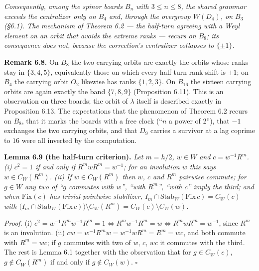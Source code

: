 \documentclass[
]{article}
\begin{document}
\emph{Consequently, among the spinor boards \(B_n\) with
\(3 \le n \le 8\), the shared grammar exceeds the centralizer only on
\(B_4\) and, through the overgroup \(W(D_4)\), on \(B_3\) (§6.1). The
mechanism of Theorem 6.2 --- the half-turn agreeing with a Weyl element
on an orbit that avoids the extreme ranks --- recurs on \(B_8\); its
consequence does not, because the correction's centralizer collapses to
\(\{\pm 1\}\).}

\textbf{Remark 6.8.} On \(B_8\) the two carrying orbits are exactly the
orbits whose ranks stay in \(\{3,4,5\}\), equivalently those on which
every half-turn rank-shift is \(\pm 1\); on \(B_4\) the carrying orbit
\(O_2\) likewise has ranks \(\{1,2,3\}\). On \(B_{16}\) the sixteen
carrying orbits are again exactly the band \(\{7,8,9\}\) (Proposition
6.11). This is an observation on three boards; the orbit of \(\lambda\)
itself is described exactly in Proposition 6.13. The expectations that
the phenomenon of Theorem 6.2 recurs on \(B_8\), that it marks the
boards with a free clock (``\(n\) a power of 2''), that \(-1\) exchanges
the two carrying orbits, and that \(D_9\) carries a survivor at a lag
coprime to \(16\) were all inverted by the computation.

\textbf{Lemma 6.9 (the half-turn criterion).} \emph{Let \(m = h/2\),
\(w \in W\) and \(c = w^{-1}R^m\). (i) \(c^2 = 1\) if and only if
\(R^m w R^m = w^{-1}\); for an involution \(w\) this says
\(w \in C_W(R^m)\). (ii) If \(w \in C_W(R^m)\) then \(w\), \(c\) and
\(R^m\) pairwise commute; for \(g \in W\) any two of ``\(g\) commutes
with \(w\)'', ``with \(R^m\)'', ``with \(c\)'' imply the third; and when
\(\mathrm{Fix}(c)\) has trivial pointwise stabilizer,
\(I_m \cap \mathrm{Stab}_W(\mathrm{Fix}\,c) = C_W(c)\) with
\(\big(I_m \cap \mathrm{Stab}_W(\mathrm{Fix}\,c)\big) \setminus C_W(R^m) = C_W(c) \setminus C_W(w)\).}

\emph{Proof.} (i)
\(c^2 = w^{-1}R^m w^{-1}R^m = 1 \iff R^m w^{-1} R^m = w \iff R^m w R^m = w^{-1}\),
since \(R^m\) is an involution. (ii)
\(cw = w^{-1}R^m w = w^{-1} w R^m = R^m = wc\), and both commute with
\(R^m = wc\); if \(g\) commutes with two of \(w\), \(c\), \(wc\) it
commutes with the third. The rest is Lemma 6.1 together with the
observation that for \(g \in C_W(c)\), \(g \notin C_W(R^m)\) if and only
if \(g \notin C_W(w)\). \(\square\)
\end{document}

